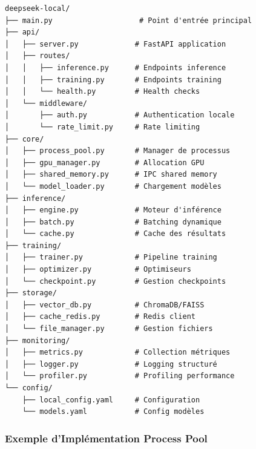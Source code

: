 \documentclass[12pt,a4paper]{article}
\begin{document}
\begin{verbatim}
deepseek-local/
├── main.py                    # Point d'entrée principal
├── api/
│   ├── server.py             # FastAPI application
│   ├── routes/
│   │   ├── inference.py      # Endpoints inference
│   │   ├── training.py       # Endpoints training
│   │   └── health.py         # Health checks
│   └── middleware/
│       ├── auth.py           # Authentication locale
│       └── rate_limit.py     # Rate limiting
├── core/
│   ├── process_pool.py       # Manager de processus
│   ├── gpu_manager.py        # Allocation GPU
│   ├── shared_memory.py      # IPC shared memory
│   └── model_loader.py       # Chargement modèles
├── inference/
│   ├── engine.py             # Moteur d'inférence
│   ├── batch.py              # Batching dynamique
│   └── cache.py              # Cache des résultats
├── training/
│   ├── trainer.py            # Pipeline training
│   ├── optimizer.py          # Optimiseurs
│   └── checkpoint.py         # Gestion checkpoints
├── storage/
│   ├── vector_db.py          # ChromaDB/FAISS
│   ├── cache_redis.py        # Redis client
│   └── file_manager.py       # Gestion fichiers
├── monitoring/
│   ├── metrics.py            # Collection métriques
│   ├── logger.py             # Logging structuré
│   └── profiler.py           # Profiling performance
└── config/
    ├── local_config.yaml     # Configuration
    └── models.yaml           # Config modèles
\end{verbatim}

\subsubsection{Exemple d'Implémentation Process Pool}
\end{document}
